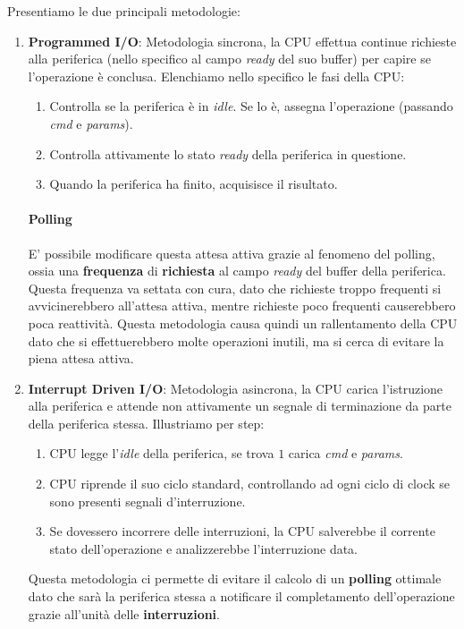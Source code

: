 \documentclass{article}
\begin{document}
Presentiamo le due principali metodologie:

\begin{enumerate}
    \item \textbf{Programmed I/O}: Metodologia sincrona, la CPU effettua continue richieste alla periferica (nello specifico al campo \textit{ready} del suo buffer) per capire se l'operazione è conclusa. Elenchiamo nello specifico le fasi della CPU:
    \begin{enumerate}
        \item Controlla se la periferica è in \textit{idle}. Se lo è, assegna l'operazione (passando \textit{cmd} e \textit{params}).
        \item Controlla attivamente lo stato \textit{ready} della periferica in questione.
        \item Quando la periferica ha finito, acquisisce il risultato.
    \end{enumerate}

    \paragraph{Polling} E' possibile modificare questa attesa attiva grazie al fenomeno del polling, ossia una \textbf{frequenza} di \textbf{richiesta} al campo \textit{ready} del buffer della periferica. Questa frequenza va settata con cura, dato che richieste troppo frequenti si avvicinerebbero all'attesa attiva, mentre richieste poco frequenti causerebbero poca reattività. Questa metodologia causa quindi un rallentamento della CPU dato che si effettuerebbero molte operazioni inutili, ma si cerca di evitare la piena attesa attiva.

    \item \textbf{Interrupt Driven I/O}: Metodologia asincrona, la CPU carica l'istruzione alla periferica e attende non attivamente un segnale di terminazione da parte della periferica stessa. Illustriamo per step:
    \begin{enumerate}
        \item CPU legge l'\textit{idle} della periferica, se trova $1$ carica \textit{cmd} e \textit{params}.
        \item CPU riprende il suo ciclo standard, controllando ad ogni ciclo di clock se sono presenti segnali d'interruzione.
        \item Se dovessero incorrere delle interruzioni, la CPU salverebbe il corrente stato dell'operazione e analizzerebbe l'interruzione data.
    \end{enumerate}
    Questa metodologia ci permette di evitare il calcolo di un \textbf{polling} ottimale dato che sarà la periferica stessa a notificare il completamento dell'operazione grazie all'unità delle \textbf{interruzioni}.
\end{enumerate}
\end{document}
